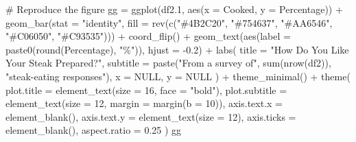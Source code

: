 \documentclass[
  letterpaper,
  DIV=11,
  numbers=noendperiod]{scrartcl}
\newenvironment{Shaded}{\begin{snugshade}}{\end{snugshade}}
\newcommand{\AttributeTok}[1]{\textcolor[rgb]{0.40,0.45,0.13}{#1}}
\newcommand{\CommentTok}[1]{\textcolor[rgb]{0.37,0.37,0.37}{#1}}
\newcommand{\ConstantTok}[1]{\textcolor[rgb]{0.56,0.35,0.01}{#1}}
\newcommand{\DecValTok}[1]{\textcolor[rgb]{0.68,0.00,0.00}{#1}}
\newcommand{\FloatTok}[1]{\textcolor[rgb]{0.68,0.00,0.00}{#1}}
\newcommand{\FunctionTok}[1]{\textcolor[rgb]{0.28,0.35,0.67}{#1}}
\newcommand{\NormalTok}[1]{\textcolor[rgb]{0.00,0.23,0.31}{#1}}
\newcommand{\OtherTok}[1]{\textcolor[rgb]{0.00,0.23,0.31}{#1}}
\newcommand{\SpecialCharTok}[1]{\textcolor[rgb]{0.37,0.37,0.37}{#1}}
\newcommand{\StringTok}[1]{\textcolor[rgb]{0.13,0.47,0.30}{#1}}
\begin{document}
\begin{Shaded}
\begin{Highlighting}[]
\CommentTok{\# Reproduce the figure}
\NormalTok{gg }\OtherTok{=} \FunctionTok{ggplot}\NormalTok{(df2}\FloatTok{.1}\NormalTok{, }\FunctionTok{aes}\NormalTok{(}\AttributeTok{x =}\NormalTok{ Cooked, }\AttributeTok{y =}\NormalTok{ Percentage)) }\SpecialCharTok{+}
  \FunctionTok{geom\_bar}\NormalTok{(}\AttributeTok{stat =} \StringTok{"identity"}\NormalTok{, }\AttributeTok{fill =} \FunctionTok{rev}\NormalTok{(}\FunctionTok{c}\NormalTok{(}\StringTok{"\#4B2C20"}\NormalTok{, }\StringTok{"\#754637"}\NormalTok{, }\StringTok{"\#AA6546"}\NormalTok{, }\StringTok{"\#C06050"}\NormalTok{, }\StringTok{"\#C93535"}\NormalTok{))) }\SpecialCharTok{+}
  \FunctionTok{coord\_flip}\NormalTok{() }\SpecialCharTok{+}  
  \FunctionTok{geom\_text}\NormalTok{(}\FunctionTok{aes}\NormalTok{(}\AttributeTok{label =} \FunctionTok{paste0}\NormalTok{(}\FunctionTok{round}\NormalTok{(Percentage), }\StringTok{"\%"}\NormalTok{)), }\AttributeTok{hjust =} \SpecialCharTok{{-}}\FloatTok{0.2}\NormalTok{) }\SpecialCharTok{+} 
  \FunctionTok{labs}\NormalTok{(}
    \AttributeTok{title =} \StringTok{"\textquotesingle{}How Do You Like Your Steak Prepared?\textquotesingle{}"}\NormalTok{,}
    \AttributeTok{subtitle =} \FunctionTok{paste}\NormalTok{(}\StringTok{"From a survey of"}\NormalTok{, }\FunctionTok{sum}\NormalTok{(}\FunctionTok{nrow}\NormalTok{(df2)), }\StringTok{"steak{-}eating responses"}\NormalTok{),}
    \AttributeTok{x =} \ConstantTok{NULL}\NormalTok{,}
    \AttributeTok{y =} \ConstantTok{NULL}
\NormalTok{  ) }\SpecialCharTok{+}
  \FunctionTok{theme\_minimal}\NormalTok{() }\SpecialCharTok{+}
  \FunctionTok{theme}\NormalTok{(}
    \AttributeTok{plot.title =} \FunctionTok{element\_text}\NormalTok{(}\AttributeTok{size =} \DecValTok{16}\NormalTok{, }\AttributeTok{face =} \StringTok{"bold"}\NormalTok{),}
    \AttributeTok{plot.subtitle =} \FunctionTok{element\_text}\NormalTok{(}\AttributeTok{size =} \DecValTok{12}\NormalTok{, }\AttributeTok{margin =} \FunctionTok{margin}\NormalTok{(}\AttributeTok{b =} \DecValTok{10}\NormalTok{)),}
    \AttributeTok{axis.text.x =} \FunctionTok{element\_blank}\NormalTok{(),}
    \AttributeTok{axis.text.y =} \FunctionTok{element\_text}\NormalTok{(}\AttributeTok{size =} \DecValTok{12}\NormalTok{),}
    \AttributeTok{axis.ticks =} \FunctionTok{element\_blank}\NormalTok{(),}
    \AttributeTok{aspect.ratio =} \FloatTok{0.25}
\NormalTok{  )}
\NormalTok{gg}
\end{Highlighting}
\end{Shaded}
\end{document}
